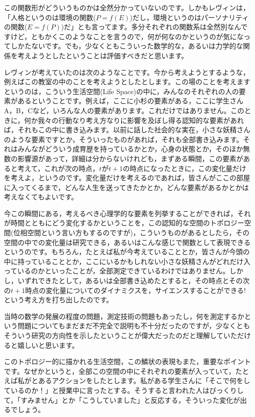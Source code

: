\documentclass{ltjsbook}
\begin{document}
この関数形がどういうものかは全然分かっていないのです。しかもレヴィンは，「人格というのは環境の関数($P=f(E)$)だし，環境というのはパーソナリティの関数($E=f(P)$)だ」とも言ってます。多分それぞれの関数系は全然別なんですけど，ともかくこのようなことを言うので，何が何なのかというのが気になってしかたないです。でも，少なくともこういった数学的な，あるいは力学的な関係を考えようとしたということは評価すべきだと思います。


レヴィンが考えていたのは次のようなことです。今から考えようとするような，例えばこの教室の中のことを考えようとしたとします。この場のことを考えますというのは，こういう生活空間(Life Space)の中に，みんなのそれぞれの人の要素があるということです。例えば，ここに小杉の要素がある，ここに学生さんA，B，Cなど，いろんな人の要素があります。これだけではありません。このときに，何か我々の行動なり考え方なりに影響を及ぼし得る認知的な要素があれば，それもこの中に書き込みます。以前に話した社会的な実在，小さな妖精さんのような要素ですとか，そういったものがあれば，それも全部書き込みます。それはみんながどういう成育歴を持っているかとか，心身の状態とか，そのほか無数の影響源があって，詳細は分からないけれども，まずある瞬間，この要素があると考えて，これが次の時点，$t$が$t+1$の時点になったときに，この変化量だけを考えよ，というのです。変化量だけを考えるのであれば，皆さんがここの部屋に入ってくるまで，どんな人生を送ってきたかとか，どんな要素があるかとかは考えなくてもよいです。

今この瞬間にある，考えるべき心理学的な要素を列挙することができれば，それが時間とともにどう変化するかということを，この認知的な空間のトポロジー空間(位相空間という言い方もするのですが)，こういうものがあるとしたら，その空間の中での変化量は研究できる，あるいはこんな感じで関数として表現できるというのです。もちろん，たとえば私が今考えていることとか，皆さんが今頭の中に持っていることとか，ここにいるかもしれない小さな妖精さんがどれだけ入っているのかといったことが，全部測定できているわけではありません。しかし，いずれできたとして，あるいは全部書き込めたとすると，その時点とその次の$t+1$時点の変化量についてのダイナミクスを，サイエンスすることができる!という考え方を打ち出したのです。

当時の数学の発展の程度の問題，測定技術の問題もあったし，何を測定するかという問題についてもまだまだ不完全で説明も不十分だったのですが，少なくともそういう研究の方向性を示したということが偉大だったのだと理解していただけると嬉しいと思います。

このトポロジー的に描かれる生活空間，この鱗状の表現もまた，重要なポイントです。なぜかというと，全部この空間の中にそれぞれの要素が入っていて，たとえば私がとあるアクションをしたとします。私がある学生さんに「そこで何をしているのか！」と授業中に言ったとする。そうすると言われた人はびっくりして，「すみません」とか「こうしていました」と反応する，そういった変化が出るでしょう。
\end{document}
